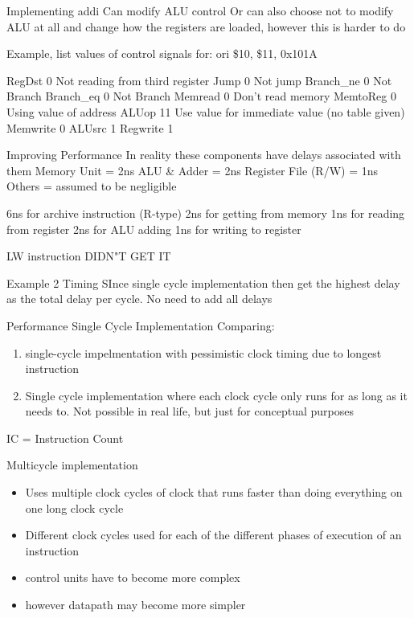 \documentclass{article}
\begin{document}
		Implementing addi
			Can modify ALU control
			Or can also choose not to modify ALU at all and change how the registers are loaded, however this is harder to do


		Example, list values of control signals for:   
			ori \$10, \$11, 0x101A

			RegDst		0	Not reading from third register
			Jump		0	Not jump
			Branch\_ne	0	Not Branch
			Branch\_eq	0	Not Branch
			Memread		0	Don't read memory
			MemtoReg	0	Using value of address
			ALUop		11	Use value for immediate value (no table given)
			Memwrite	0
			ALUsrc		1
			Regwrite	1

	Improving Performance
		In reality these components have delays associated with them
		Memory Unit = 2ns
		ALU \& Adder = 2ns
		Register File (R/W) = 1ns
		Others = assumed to be negligible

		6ns for archive instruction (R-type)
			2ns for getting from memory
			1ns for reading from register
			2ns for ALU adding
			1ns for writing to register

		LW instruction
			DIDN"T GET IT

		Example 2
			Timing
				SInce single cycle implementation then get the highest delay as the total delay per cycle. No need to add all delays

		Performance Single Cycle Implementation
			Comparing:
			\begin{enumerate}
				\item single-cycle impelmentation with pessimistic clock timing due to longest instruction
				\item Single cycle implementation where each clock cycle only runs for as long as it needs to. Not possible in real life, but just for conceptual purposes
			\end{enumerate}

			IC = Instruction Count

		Multicycle implementation
		\begin{itemize}
			\item Uses multiple clock cycles of clock that runs faster than doing everything on one long clock cycle
			\item Different clock cycles used for each of the different phases of execution of an instruction
			\item control units have to become more complex
			\item however datapath may become more simpler
		\end{itemize}
\end{document}
